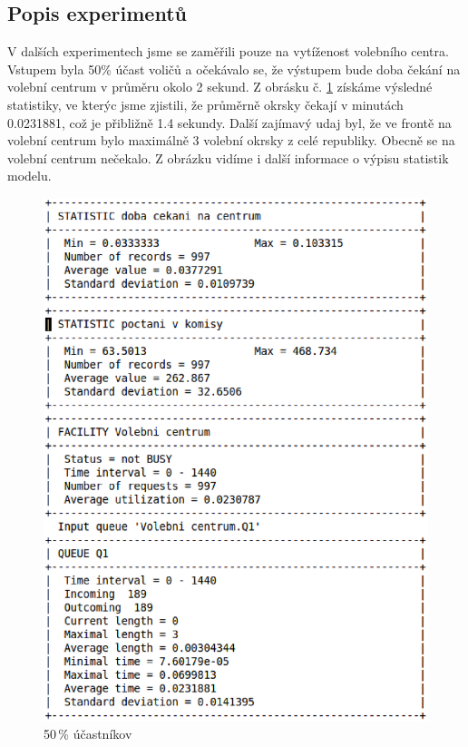 \documentclass[12pt,a4paper,titlepage,final]{article}
\begin{document}
\subsection{Popis experimentů}
V dalších experimentech jsme se zaměřili pouze na vytíženost volebního centra. 
Vstupem byla 50\% účast voličů a očekávalo se, že výstupem bude doba čekání na volební centrum v průměru okolo 2 sekund. Z obrásku č.  \ref{50} získáme  výsledné statistiky, ve kterýc jsme zjistili, že průměrně okrsky čekají v minutách 0.0231881, což je přibližně 1.4 sekundy. Další zajímavý udaj byl, že ve frontě na volební centrum bylo maximálně 3 volební okrsky z celé republiky. Obecně se na volební centrum nečekalo. Z obrázku vidíme i další informace o výpisu statistik modelu. \newline
\newline
\begin{figure}

\begin{center}

\includegraphics[scale=0.6]{img/0_5.eps} 
\caption{50\,\% účastníkov}
\label{50}

\end{center}

\end{figure}
\end{document}
